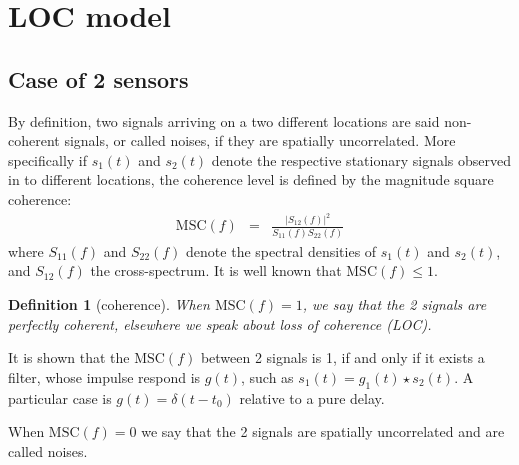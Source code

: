 \documentclass[a4paper, 12pt]{report}
\newtheorem{definition}{Definition}
\def\MSC{\mathrm{MSC}}
\begin{document}
\newpage\clearpage
 \section{LOC model}
\subsection{Case of 2 sensors}
By definition, two signals arriving on a two different locations are said non-coherent signals, or called noises, if they are spatially uncorrelated. More specifically if $s_{1}(t)$ and $s_{2}(t)$ denote the respective stationary signals observed in to different locations, the coherence level is defined by the magnitude square coherence:
\begin{eqnarray*}
 \MSC(f)&=&\frac{|S_{12}(f)|^{2}}{S_{11}(f)S_{22}(f)}
\end{eqnarray*}
where $S_{11}(f)$ and $S_{22}(f)$ denote the spectral densities of $s_{1}(t)$ and $s_{2}(t)$, and $S_{12}(f)$ the cross-spectrum. It is well known that $\MSC(f)\leq 1$. 
\begin{definition}[coherence]
\label{def:coherence2sensors}
When $\MSC(f)=1$, we say that the 2 signals are perfectly coherent, elsewhere we speak about loss of coherence (LOC). 
\end{definition}


It is shown that the  $\MSC(f)$ between 2 signals is 1, if and only if it exists a filter, whose impulse respond is $g(t)$, such as $s_{1}(t)=g_{1}(t)\star s_{2}(t)$. A particular case is $g(t)=\delta(t-t_{0})$ relative to a pure delay.


  \medskip
 When $\MSC(f)=0$ we say that the 2 signals are spatially uncorrelated and are called noises.



\end{document}
